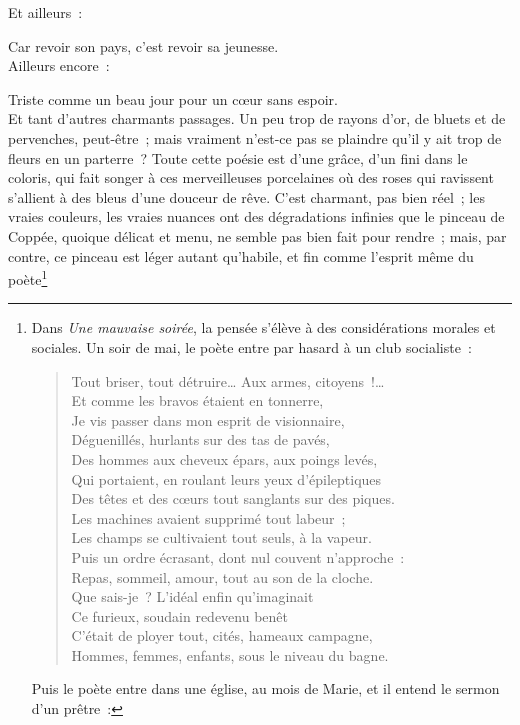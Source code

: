 \documentclass[french,twoside]{book} %
\begin{document}
\noindent Et ailleurs :\par

Car revoir son pays, c’est revoir sa jeunesse.\\

\noindent Ailleurs encore :\par

Triste comme un beau jour pour un cœur sans espoir.\\

\noindent Et tant d’autres charmants passages. Un peu trop de rayons d’or, de bluets et de pervenches, peut-être ; mais vraiment n’est-ce pas se plaindre qu’il y ait trop de fleurs en un parterre ? Toute cette poésie est d’une grâce, d’un fini dans le coloris, qui fait songer à ces merveilleuses porcelaines où des roses qui ravissent s’allient à des bleus d’une douceur de rêve. C’est charmant, pas bien réel ; les vraies couleurs, les vraies nuances ont des dégradations infinies que le pinceau de Coppée, quoique délicat et menu, ne semble pas bien fait pour rendre ; mais, par contre, ce pinceau est léger autant qu’habile, et fin comme l’esprit même du poète\footnote{\noindent Dans \emph{Une mauvaise soirée}, la pensée s’élève à des considérations morales et sociales. Un soir de mai, le poète entre par hasard à un club socialiste :\par
  
\begin{verse}
Tout briser, tout détruire… Aux armes, citoyens !…\\
 Et comme les bravos étaient en tonnerre,\\
 Je vis passer dans mon esprit de visionnaire,\\
 Déguenillés, hurlants sur des tas de pavés,\\
 Des hommes aux cheveux épars, aux poings levés,\\
 Qui portaient, en roulant leurs yeux d’épileptiques\\
 Des têtes et des cœurs tout sanglants sur des piques.\\
 Les machines avaient supprimé tout labeur ;\\
 Les champs se cultivaient tout seuls, à la vapeur.\\
 Puis un ordre écrasant, dont nul couvent n’approche :\\
 Repas, sommeil, amour, tout au son de la cloche.\\
 Que sais-je ? L’idéal enfin qu’imaginait\\
 Ce furieux, soudain redevenu benêt\\
 C’était de ployer tout, cités, hameaux campagne,\\
 Hommes, femmes, enfants, sous le niveau du bagne.\\
\end{verse}
 \par
\noindent Puis le poète entre dans une église, au mois de Marie, et il entend le sermon d’un prêtre :\par

}
\end{document}
